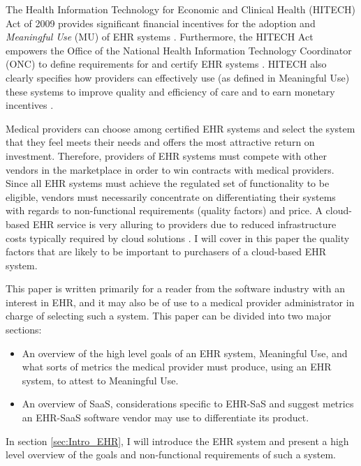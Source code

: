 \documentclass[10pt]{article}
\begin{document}
The Health Information Technology for Economic and Clinical Health (HITECH) Act of 2009 provides significant financial incentives for the adoption and \textit{Meaningful Use} (MU) of EHR systems \cite{ehrbook}.
Furthermore, the HITECH Act empowers the Office of the National Health Information Technology Coordinator (ONC) to define requirements for and certify EHR systems \cite{onc-ehr}.
HITECH also clearly specifies how providers can effectively use (as defined in Meaningful Use) these systems to improve quality and efficiency of care and to earn monetary incentives \cite{ehrbook}.

Medical providers can choose among certified EHR systems and select the system that they feel meets their needs and offers the most attractive return on investment.
Therefore, providers of EHR systems must compete with other vendors in the marketplace in order to win contracts with medical providers.
Since all EHR systems must achieve the regulated set of functionality to be eligible, vendors must necessarily concentrate on differentiating their systems with regards to non-functional requirements (quality factors) and price.
A cloud-based EHR service is very alluring to providers due to reduced infrastructure costs typically required by cloud solutions \cite{auditingprivacy}.
I will cover in this paper the quality factors that are likely to be important to purchasers of a cloud-based EHR system.

This paper is written primarily for a reader from the software industry with an interest in EHR, and it may also be of use to a medical provider administrator in charge of selecting such a system.
This paper can be divided into two major sections:
\begin{itemize}
	\item An overview of the high level goals of an EHR system, Meaningful Use, and what sorts of metrics the medical provider must produce, using an EHR system, to attest to Meaningful Use.
	\item An overview of SaaS, considerations specific to EHR-SaS and suggest metrics an EHR-SaaS software vendor may use to differentiate its product.
\end{itemize}

In section \ref{sec:Intro_EHR}, I will introduce the EHR system and present a high level overview of the goals and non-functional requirements of such a system.
\end{document}
